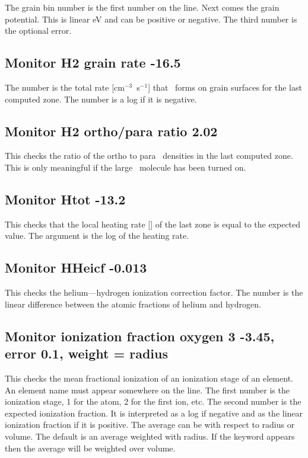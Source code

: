 The grain bin number is the first number on the line.  Next comes the
grain potential.
This is linear eV and can be positive or negative.
The third number is the optional error.

\subsection{Monitor H2 grain rate -16.5}

The number is the total rate [cm$^{-3}$~s$^{-1}$] that \htwo\ forms on grain surfaces
for the last computed zone.
The number is a log if it is negative.

\subsection{Monitor H2 ortho/para ratio 2.02}

This checks the ratio of the ortho to para \htwo\ densities in the last
computed zone.
This is only meaningful if the large \htwo\ molecule has been
turned on.

\subsection{Monitor Htot -13.2}

This checks that the local heating rate [\ergpccmps ]
of the last zone is equal to the expected value.
The argument is the log of the heating rate.

\subsection{Monitor HHeicf -0.013}

This checks the helium---hydrogen ionization correction factor.
The number is the linear difference between the atomic fractions
of helium and hydrogen.

\subsection{Monitor ionization fraction oxygen 3 -3.45, error 0.1, weight =
radius}

This checks the mean fractional ionization of an ionization stage of
an element.
An element name must appear somewhere on the line.
The first
number is the ionization stage, 1 for the atom, 2 for the first ion, etc.
The second number is the expected ionization fraction.
It is interpreted
as a log if negative and as the linear ionization fraction if it is positive.
The average can be with respect to radius or volume.
The default is an
average weighted with radius.
If the keyword  appears then the average
will be weighted over volume.

